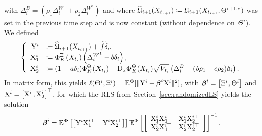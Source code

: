 with $\Delta^{B}_{i}=(\rho_1\Delta^{W^1}_{i} + \rho_2\Delta^{W^2}_{i})$ and where $\widehat{\mathfrak{U}}_{i+1}(X_{t_{i+1}})\coloneqq \mathfrak{U}_{i+1}(X_{t_{i+1}}; \Theta^{i+1,*})$ was set in the previous time step and is now constant (without dependence on~$\Theta^i$). We defined
\begin{equation}\label{eq:SystemNonMark}
\left\{
\begin{array}{rl}
\mathrm{Y}^i & \coloneqq  \displaystyle \widehat{\mathfrak{U}}_{i+1}(X_{t_{i+1}}) + \widetilde{f}\delta_{i} , \\
     \mathrm{X}_1^i &\coloneqq  \displaystyle \Phi_K^\Xi(X_{t_i})\left(\Delta^{W^1}_{i}-b\delta_{i} \right), \\ 
    \mathrm{X}_2^i &\coloneqq  \displaystyle (1-a\delta_{i} )\Phi_K^\Theta(X_{t_i}) + \mathrm{D}_{x}\Phi_K^\Theta(X_{t_i})
    \sqrt{V_{t_i}}\left(\Delta^{B}_{i}-(b\rho_1 + c\rho_2)\delta_{i}  \right).
\end{array}
\right.
\end{equation}
In matrix form, this yields
$
\ell(\Theta^i, \Xi^i) = \mathbb{E}^\Phi[\|\mathrm{Y}^i - \boldsymbol{\beta}^i\mathrm{X}^i\|^2]$,
with 
$\boldsymbol{\beta}^i=\begin{bmatrix}\Xi^i, \Theta^i\end{bmatrix}$
and
$\mathrm{X}^i= \begin{bmatrix}\mathrm{X}_1^i, \mathrm{X}_2^i\end{bmatrix}^{\top}$,
for which the RLS from Section~\ref{sec:randomizedLS}
yields the solution
\begin{equation}\label{eq:betaestimator}
    \boldsymbol{\beta}^i = \mathbb{E}^\Phi\left[
    \left[\mathrm{Y}^i\mathrm{X}_1^{i\top} \quad \mathrm{Y}^i\mathrm{X}_2^{i\top}\right] \right]
    \mathbb{E}^\Phi\left[
    \left[\begin{array}{cc}
         \mathrm{X}_1^i\mathrm{X}_1^{i\top} & \mathrm{X}_1^i\mathrm{X}_2^{i\top} \\
         \mathrm{X}_2^i\mathrm{X}_1^{i\top} & \mathrm{X}_2^i\mathrm{X}_2^{i\top}
    \end{array}\right]\right]^{-1}.
\end{equation}



